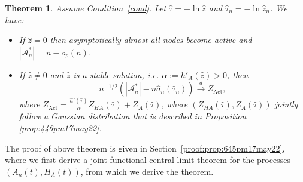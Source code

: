 \documentclass[11pt]{article}
\newtheorem{theorem}{Theorem}[section]
\def\tod{\stackrel{d}{\longrightarrow}}
\def\top{\stackrel{p}{\longrightarrow}}
\newcommand{\cA}{\mathcal{A}}
\def\tod{\stackrel{d}{\longrightarrow}}
\def\top{\stackrel{p}{\longrightarrow}}
\begin{document}
\begin{theorem}\label{prop:645pm17may22}
Assume Condition~\ref{cond}. Let $\widehat{\tau}=-\ln{\widehat{z}}$ and $\widehat{\tau}_n=-\ln{\widehat{z}_n}$. We have:
\begin{itemize}
\item If $\widehat{z}=0$ then asymptotically almost all nodes become active and $|\cA^*_n|=n-o_p(n)$.
\item If $\widehat{z}\neq0$ and $\widehat{z}$ is a stable solution, i.e. $\alpha:=h'_A(\widehat{z})>0$, then 
\begin{equation*}
n^{-1/2}\left(|\cA^*_n|-  n\widehat{a}_n(\widehat{\tau}_n)\right) \tod Z_{\text{Act}},
\end{equation*}
where $Z_{\text{Act}}= \frac{{\widehat{a}'}(\widehat{\tau})}{\alpha} Z_{HA}(\widehat{\tau})+ Z_A(\widehat{\tau})$, where $(Z_{HA}(\widehat{\tau}),  Z_A(\widehat{\tau}))$ jointly follow a Gaussian distribution that is described in Proposition \ref{prop:446pm17may22}.  

\end{itemize}


\end{theorem} 

The proof of above theorem is given in Section~\ref{proof:prop:645pm17may22}, where we first derive a joint functional central limit theorem for the processes $(A_n(t),H_A(t))$, from which we derive the theorem.


%
\end{document}
